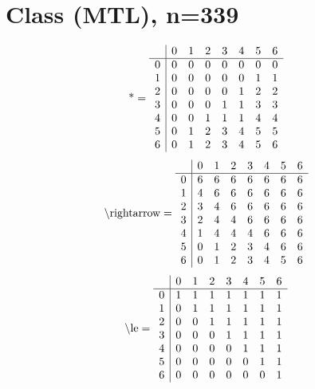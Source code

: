 \documentclass[11pt]{article}
\begin{document}
\section{Class (MTL), n=339}
\[\text{*} = 
\begin{array}{r | r r r r r r r}
 & 0 & 1 & 2 & 3 & 4 & 5 & 6 \\ \hline
0 & 0 & 0 & 0 & 0 & 0 & 0 & 0 \\
1 & 0 & 0 & 0 & 0 & 0 & 1 & 1 \\
2 & 0 & 0 & 0 & 0 & 1 & 2 & 2 \\
3 & 0 & 0 & 0 & 1 & 1 & 3 & 3 \\
4 & 0 & 0 & 1 & 1 & 1 & 4 & 4 \\
5 & 0 & 1 & 2 & 3 & 4 & 5 & 5 \\
6 & 0 & 1 & 2 & 3 & 4 & 5 & 6 \\
\end{array}
\]
\[\text{\textbackslash rightarrow} = 
\begin{array}{r | r r r r r r r}
 & 0 & 1 & 2 & 3 & 4 & 5 & 6 \\ \hline
0 & 6 & 6 & 6 & 6 & 6 & 6 & 6 \\
1 & 4 & 6 & 6 & 6 & 6 & 6 & 6 \\
2 & 3 & 4 & 6 & 6 & 6 & 6 & 6 \\
3 & 2 & 4 & 4 & 6 & 6 & 6 & 6 \\
4 & 1 & 4 & 4 & 4 & 6 & 6 & 6 \\
5 & 0 & 1 & 2 & 3 & 4 & 6 & 6 \\
6 & 0 & 1 & 2 & 3 & 4 & 5 & 6 \\
\end{array}
\]
\[\text{\textbackslash le} = 
\begin{array}{r | r r r r r r r}
 & 0 & 1 & 2 & 3 & 4 & 5 & 6 \\ \hline
0 & 1 & 1 & 1 & 1 & 1 & 1 & 1 \\
1 & 0 & 1 & 1 & 1 & 1 & 1 & 1 \\
2 & 0 & 0 & 1 & 1 & 1 & 1 & 1 \\
3 & 0 & 0 & 0 & 1 & 1 & 1 & 1 \\
4 & 0 & 0 & 0 & 0 & 1 & 1 & 1 \\
5 & 0 & 0 & 0 & 0 & 0 & 1 & 1 \\
6 & 0 & 0 & 0 & 0 & 0 & 0 & 1 \\
\end{array}
\]
\end{document}
